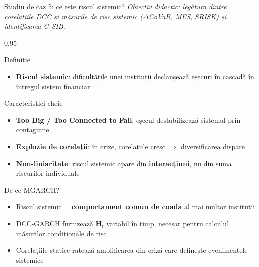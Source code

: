 \documentclass[9pt, aspectratio=169, t]{beamer}
\begin{document}
\begin{frame}{Studiu de caz 5: ce este riscul sistemic?}
    \vspace{-2mm}
    {\scriptsize\textit{Obiectiv didactic: legătura dintre corelațiile DCC și măsurile de risc sistemic ($\Delta$CoVaR, MES, SRISK) și identificarea G-SIB.}}\vspace{1mm}
    \begin{cminipage}{0.95\textwidth}
    {\scriptsize
    \begin{block}{Definiție}
        \begin{itemize}\setlength{\itemsep}{0pt}
            \item \textbf{Riscul sistemic}: dificultățile unei instituții declanșează eșecuri în cascadă în întregul sistem financiar
        \end{itemize}
    \end{block}
    \vspace{-2mm}
    \begin{block}{Caracteristici cheie}
        \begin{itemize}\setlength{\itemsep}{0pt}
            \item \textbf{Too Big / Too Connected to Fail}: eșecul destabilizează sistemul prin contagiune
            \item \textbf{Explozie de corelații}: în crize, corelațiile cresc $\Rightarrow$ diversificarea dispare
            \item \textbf{Non-liniaritate}: riscul sistemic apare din \textbf{interacțiuni}, nu din suma riscurilor individuale
        \end{itemize}
    \end{block}
    \vspace{-2mm}
    \begin{alertblock}{De ce MGARCH?}
        \begin{itemize}\setlength{\itemsep}{0pt}
            \item Riscul sistemic = \textbf{comportament comun de coadă} al mai multor instituții
            \item DCC-GARCH furnizează $\mathbf{H}_t$ variabil în timp, necesar pentru calculul măsurilor condiționale de risc
            \item Corelațiile statice ratează amplificarea din criză care definește evenimentele sistemice
        \end{itemize}
    \end{alertblock}
    }
    \end{cminipage}
\end{frame}
\end{document}
